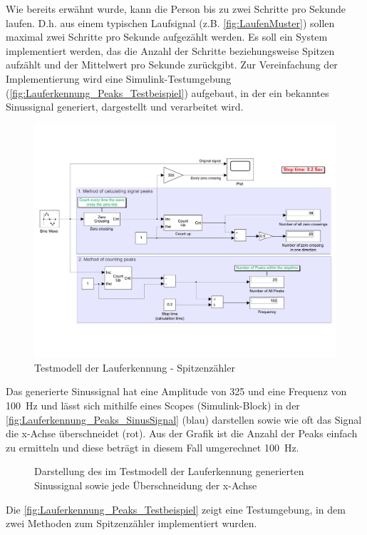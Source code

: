 Wie bereits erwähnt wurde, kann die Person bis zu zwei Schritte pro Sekunde laufen. D.h. aus einem typischen Laufsignal (z.B. \autoref{fig:LaufenMuster}) sollen maximal zwei Schritte pro Sekunde aufgezählt werden.
Es soll ein System implementiert werden, das die Anzahl der Schritte beziehungsweise Spitzen aufzählt und der Mittelwert pro Sekunde zurückgibt. Zur Vereinfachung der Implementierung wird eine Simulink-Testumgebung (\autoref{fig:Lauferkennung_Peaks_Testbeispiel}) aufgebaut, in der ein bekanntes Sinussignal generiert, dargestellt und verarbeitet wird.
\begin{figure}
	\centering
	\includegraphics[width=0.8\linewidth]{Bilder/TestmodellLauferkennungSpitzenzaehler.pdf}
	\caption{Testmodell der Lauferkennung - Spitzenzähler}
	\label{fig:Lauferkennung_Peaks_Testbeispiel}
\end{figure}
Das generierte Sinussignal hat eine Amplitude von 325 und eine Frequenz von \SI{100}{\hertz} und lässt sich mithilfe eines Scopes (Simulink-Block) in der \autoref{fig:Lauferkennung_Peaks_SinusSignal} (blau) darstellen sowie wie oft das Signal die x-Achse überschneidet (rot). Aus der Grafik ist die Anzahl der Peaks einfach zu ermitteln und diese beträgt in diesem Fall umgerechnet \SI{100}{\hertz}.

\begin{figure}
	\centering
	\caption{Darstellung des im Testmodell der Lauferkennung generierten Sinussignal sowie jede Überschneidung der x-Achse}
	\label{fig:Lauferkennung_Peaks_SinusSignal}
\end{figure}
Die \autoref{fig:Lauferkennung_Peaks_Testbeispiel} zeigt eine Testumgebung, in dem zwei Methoden zum Spitzenzähler implementiert wurden.

